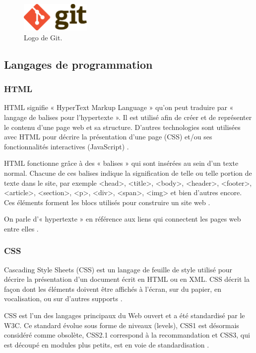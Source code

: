 \documentclass[french]{report}
\begin{document}
        \begin{figure}[H]
            \centering
            \includegraphics[width=0.3\textwidth]{images/1280px-Git-logo.svg.png}
            \caption{Logo de Git.}
            \label{fig:my_label}
        \end{figure}
        
    \subsection{Langages de programmation}
        \subsubsection{HTML}
        HTML signifie « HyperText Markup Language » qu'on peut traduire par « langage de balises pour l'hypertexte ».
	Il est utilisé afin de créer et de représenter le contenu d'une page web et sa structure. 
	D'autres technologies sont utilisées avec HTML pour décrire la présentation 
	d'une page (CSS) et/ou ses fonctionnalités interactives (JavaScript) \cite{html}.

        HTML fonctionne grâce à des « balises » qui sont insérées au sein d'un texte normal.
	Chacune de ces balises indique la signification de telle ou telle portion de texte 
	dans le site, par exemple <head>, <title>, <body>, <header>, <footer>, <article>, 
	<section>, <p>, <div>, <span>, <img> et bien d'autres encore. Ces éléments forment 
	les blocs utilisés pour construire un site web \cite{html}.

        On parle d'« hypertexte » en référence aux liens qui connectent les pages web entre elles \cite{html}.

        \subsubsection{CSS }
        Cascading Style Sheets (CSS) est un langage de feuille de style utilisé pour 
	décrire la présentation d'un document écrit en HTML ou en XML. CSS décrit la 
	façon dont les éléments doivent être affichés à l'écran, sur du papier, en vocalisation,
	ou sur d'autres supports \cite{css}.
        
        
        CSS est l'un des langages principaux du Web ouvert et a été standardisé par le W3C.
	Ce standard évolue sous forme de niveaux (levels), CSS1 est désormais considéré 
	comme obsolète, CSS2.1 correspond à la recommandation et CSS3, qui est découpé 
	en modules plus petits, est en voie de standardisation \cite{css}.
        
\end{document}
